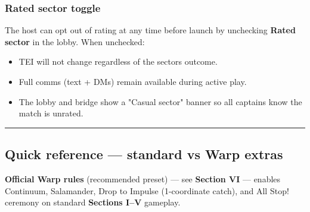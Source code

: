 \documentclass[11pt]{article}
\providecommand{\tightlist}{%
  \setlength{\itemsep}{0pt}\setlength{\parskip}{0pt}}
\begin{document}
\subsubsection{Rated sector toggle}\label{rated-sector-toggle}

The host can opt out of rating at any time before launch by unchecking
\textbf{Rated sector} in the lobby. When unchecked:

\begin{itemize}
\tightlist
\item
  TEI will not change regardless of the sector\textquotesingle s
  outcome.
\item
  Full comms (text + DMs) remain available during active play.
\item
  The lobby and bridge show a "Casual sector" banner so all captains
  know the match is unrated.
\end{itemize}

\begin{center}\rule{0.5\linewidth}{0.5pt}\end{center}

\subsection{Quick reference --- standard vs Warp
extras}\label{quick-reference--standard-vs-warp-extras}

\textbf{Official Warp rules} (recommended preset) --- see
\textbf{Section VI} --- enables Continuum, Salamander, Drop to Impulse
(1-coordinate catch), and All Stop! ceremony on standard \textbf{Sections
I--V} gameplay.
\end{document}
